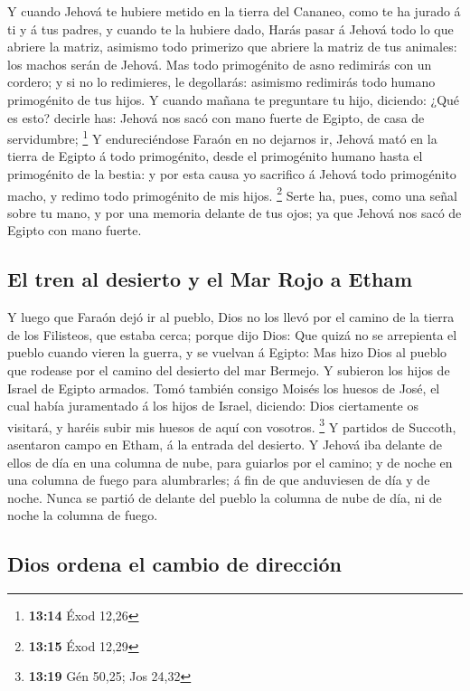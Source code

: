  Y cuando Jehová te hubiere metido en la tierra del
Cananeo, como te ha jurado á ti y á tus padres, y cuando te la hubiere
dado,  Harás pasar á Jehová todo lo que abriere la matriz,
asimismo todo primerizo que abriere la matriz de tus animales: los
machos serán de Jehová.  Mas todo primogénito de asno
redimirás con un cordero; y si no lo redimieres, le degollarás: asimismo
redimirás todo humano primogénito de tus hijos.  Y cuando
mañana te preguntare tu hijo, diciendo: ¿Qué es esto? decirle has:
Jehová nos sacó con mano fuerte de Egipto, de casa de servidumbre;
\footnote{\textbf{13:14} Éxod 12,26}  Y endureciéndose
Faraón en no dejarnos ir, Jehová mató en la tierra de Egipto á todo
primogénito, desde el primogénito humano hasta el primogénito de la
bestia: y por esta causa yo sacrifico á Jehová todo primogénito macho, y
redimo todo primogénito de mis hijos. \footnote{\textbf{13:15} Éxod
  12,29}  Serte ha, pues, como una señal sobre tu mano, y
por una memoria delante de tus ojos; ya que Jehová nos sacó de Egipto
con mano fuerte.

\hypertarget{el-tren-al-desierto-y-el-mar-rojo-a-etham}{%
\subsection{El tren al desierto y el Mar Rojo a
Etham}\label{el-tren-al-desierto-y-el-mar-rojo-a-etham}}

 Y luego que Faraón dejó ir al pueblo, Dios no los llevó
por el camino de la tierra de los Filisteos, que estaba cerca; porque
dijo Dios: Que quizá no se arrepienta el pueblo cuando vieren la guerra,
y se vuelvan á Egipto:  Mas hizo Dios al pueblo que rodease
por el camino del desierto del mar Bermejo. Y subieron los hijos de
Israel de Egipto armados.  Tomó también consigo Moisés los
huesos de José, el cual había juramentado á los hijos de Israel,
diciendo: Dios ciertamente os visitará, y haréis subir mis huesos de
aquí con vosotros. \footnote{\textbf{13:19} Gén 50,25; Jos 24,32}
 Y partidos de Succoth, asentaron campo en Etham, á la
entrada del desierto.  Y Jehová iba delante de ellos de día
en una columna de nube, para guiarlos por el camino; y de noche en una
columna de fuego para alumbrarles; á fin de que anduviesen de día y de
noche.  Nunca se partió de delante del pueblo la columna de
nube de día, ni de noche la columna de fuego.

\hypertarget{dios-ordena-el-cambio-de-direcciuxf3n}{%
\subsection{Dios ordena el cambio de
dirección}\label{dios-ordena-el-cambio-de-direcciuxf3n}}

